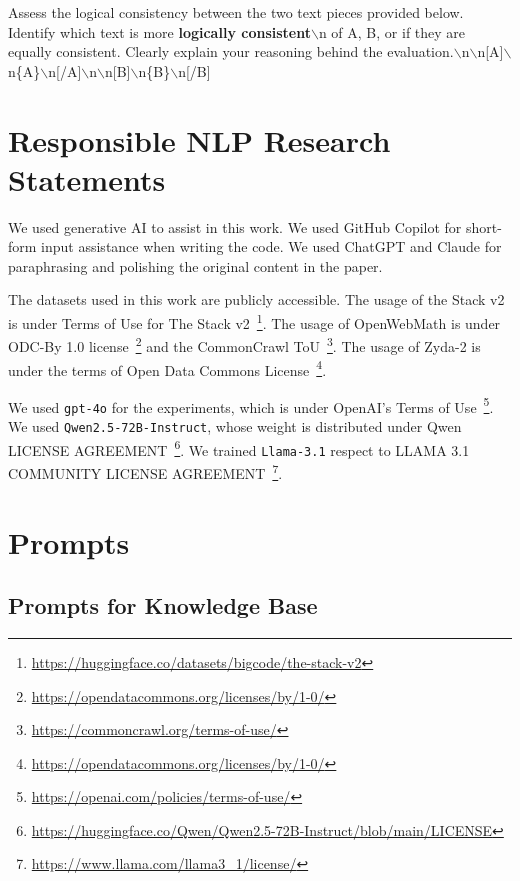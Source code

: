 \begin{tcolorbox}
    [title = {Logic}, breakable] \footnotesize Assess the logical consistency
    between the two text pieces provided below. Identify which text is more \textbf{logically
    consistent}$\backslash$n of A, B, or if they are equally consistent. Clearly
    explain your reasoning behind the evaluation.$\backslash$n$\backslash$n[A]$\backslash$n\{A\}$\backslash$n[/A]$\backslash$n$\backslash$n[B]$\backslash$n\{B\}$\backslash$n[/B]
\end{tcolorbox}

\section{Responsible NLP Research Statements}

We used generative AI to assist in this work. We used GitHub Copilot for short-form
input assistance when writing the code. We used ChatGPT and Claude for
paraphrasing and polishing the original content in the paper.

The datasets used in this work are publicly accessible. The usage of the Stack v2
is under Terms of Use for The Stack v2~\footnote{\url{https://huggingface.co/datasets/bigcode/the-stack-v2}}.
The usage of OpenWebMath is under ODC-By 1.0 license~\footnote{\url{https://opendatacommons.org/licenses/by/1-0/}}
and the CommonCrawl ToU~\footnote{\url{https://commoncrawl.org/terms-of-use/}}. The
usage of Zyda-2 is under the terms of Open Data Commons License~\footnote{\url{https://opendatacommons.org/licenses/by/1-0/}}.

We used \texttt{gpt-4o} for the experiments, which is under OpenAI's Terms of Use~\footnote{\url{https://openai.com/policies/terms-of-use/}}.
We used \texttt{Qwen2.5-72B-Instruct}, whose weight is distributed under Qwen
LICENSE AGREEMENT~\footnote{\url{https://huggingface.co/Qwen/Qwen2.5-72B-Instruct/blob/main/LICENSE}}.
We trained \texttt{Llama-3.1} respect to LLAMA 3.1 COMMUNITY LICENSE AGREEMENT~\footnote{\url{https://www.llama.com/llama3_1/license/}}.

\section{Prompts}
\label{sec:appendix_prompts}

\subsection{Prompts for Knowledge Base}

